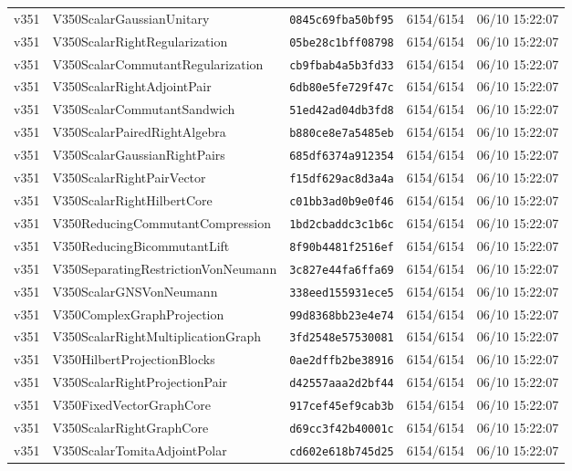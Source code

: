 \documentclass[11pt]{article}
\theoremstyle{definition}\newtheorem{deriv}{Derivation}
\begin{document}
{\begin{longtable}{@{}lllll@{}}
v351 & V350ScalarGaussianUnitary & \texttt{0845c69fba50bf95} & 6154/6154 & 06/10 15:22:07 \\
v351 & V350ScalarRightRegularization & \texttt{05be28c1bff08798} & 6154/6154 & 06/10 15:22:07 \\
v351 & V350ScalarCommutantRegularization & \texttt{cb9fbab4a5b3fd33} & 6154/6154 & 06/10 15:22:07 \\
v351 & V350ScalarRightAdjointPair & \texttt{6db80e5fe729f47c} & 6154/6154 & 06/10 15:22:07 \\
v351 & V350ScalarCommutantSandwich & \texttt{51ed42ad04db3fd8} & 6154/6154 & 06/10 15:22:07 \\
v351 & V350ScalarPairedRightAlgebra & \texttt{b880ce8e7a5485eb} & 6154/6154 & 06/10 15:22:07 \\
v351 & V350ScalarGaussianRightPairs & \texttt{685df6374a912354} & 6154/6154 & 06/10 15:22:07 \\
v351 & V350ScalarRightPairVector & \texttt{f15df629ac8d3a4a} & 6154/6154 & 06/10 15:22:07 \\
v351 & V350ScalarRightHilbertCore & \texttt{c01bb3ad0b9e0f46} & 6154/6154 & 06/10 15:22:07 \\
v351 & V350ReducingCommutantCompression & \texttt{1bd2cbaddc3c1b6c} & 6154/6154 & 06/10 15:22:07 \\
v351 & V350ReducingBicommutantLift & \texttt{8f90b4481f2516ef} & 6154/6154 & 06/10 15:22:07 \\
v351 & V350SeparatingRestrictionVonNeumann & \texttt{3c827e44fa6ffa69} & 6154/6154 & 06/10 15:22:07 \\
v351 & V350ScalarGNSVonNeumann & \texttt{338eed155931ece5} & 6154/6154 & 06/10 15:22:07 \\
v351 & V350ComplexGraphProjection & \texttt{99d8368bb23e4e74} & 6154/6154 & 06/10 15:22:07 \\
v351 & V350ScalarRightMultiplicationGraph & \texttt{3fd2548e57530081} & 6154/6154 & 06/10 15:22:07 \\
v351 & V350HilbertProjectionBlocks & \texttt{0ae2dffb2be38916} & 6154/6154 & 06/10 15:22:07 \\
v351 & V350ScalarRightProjectionPair & \texttt{d42557aaa2d2bf44} & 6154/6154 & 06/10 15:22:07 \\
v351 & V350FixedVectorGraphCore & \texttt{917cef45ef9cab3b} & 6154/6154 & 06/10 15:22:07 \\
v351 & V350ScalarRightGraphCore & \texttt{d69cc3f42b40001c} & 6154/6154 & 06/10 15:22:07 \\
v351 & V350ScalarTomitaAdjointPolar & \texttt{cd602e618b745d25} & 6154/6154 & 06/10 15:22:07 \\

\end{longtable}}
\end{document}
